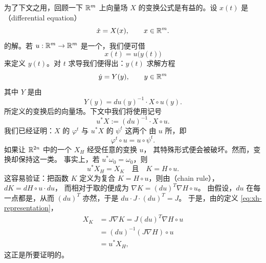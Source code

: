 为了下文之用，回顾一下 $\mathbb{R}^{m}$ 上向量场 $X$ 的变换公式是有益的。设 $x(t)$ 是\textbf{\trDifferentialEquation}（differential equation）
\[
\dot{x}=X(x),\qquad x\in\mathbb{R}^{m}.
\]
的解。若 $u:\mathbb{R}^{m}\to\mathbb{R}^{m}$ 是一个\trDiffeomorphism，我们便可借
\[
x(t)=u\bigl(y(t)\bigr)
\]
来定义\trCurve{} $y(t)$。对 $t$ 求导我们便得出：$y(t)$ 求解方程
\[
\dot{y}=Y(y),\qquad y\in\mathbb{R}^{m}
\]
其中 $Y$ 是由
\[
Y(y)=du(y)^{-1}\cdot X\circ u(y).
\]
所定义的变换后的向量场。下文中我们将使用记号
\begin{equation}\label{eq:pullback-vector-field}
u^{*}X:=(du)^{-1}\cdot X\circ u.
\end{equation}
我们已经证明：$X$ 的\trFlow{} $\varphi^{t}$ 与 $u^{*}X$ 的\trFlow{} $\psi^{t}$ 这两个\trFlow{}%
由\trDiffeomorphism{} $u$ 所\trConjugate，即
\[
\varphi^{t}\circ u=u\circ\psi^{t}.
\]
如果让 $\mathbb{R}^{2n}$ 中的一个\trHamiltonianVectorField{} $X_H$ 经受任意的变换 $u$，%
其特殊形式便会被破坏。然而，\trSymplectic{}变换却保持\trHamiltonianVectorField{}这一类。%
事实上，若 $u^{*}\omega_0=\omega_0$，则
\begin{equation}\label{eq:sympl-change-hamiltonian}
u^{*}X_H=X_K\quad\text{且}\quad K=H\circ u.
\end{equation}
这容易验证：把函数 $K$ 定义为复合 $K=H\circ u$，则由\textbf{\trChainRule}（chain rule），$dK=dH\circ u\cdot du$，%
而相对于\trEuclidean\trInnerProduct{}取的\trGradient{}便成为 $\nabla K=(du)^{T}\nabla H\circ u$。%
由假设，$du$ 在每一点都是\trSymplecticMapping，从而 $(du)^{T}$ 亦然，于是 $du\cdot J\cdot(du)^{T}=J$。%
于是，由\trHamiltonianVectorField{}的定义 \eqref{eq:xh-representation}，
\begin{align*}
X_K &= J\nabla K = J(du)^{T}\nabla H\circ u\\
    &= (du)^{-1}(J\nabla H)\circ u\\
    &= u^{*}X_H,
\end{align*}
这正是所要证明的。
